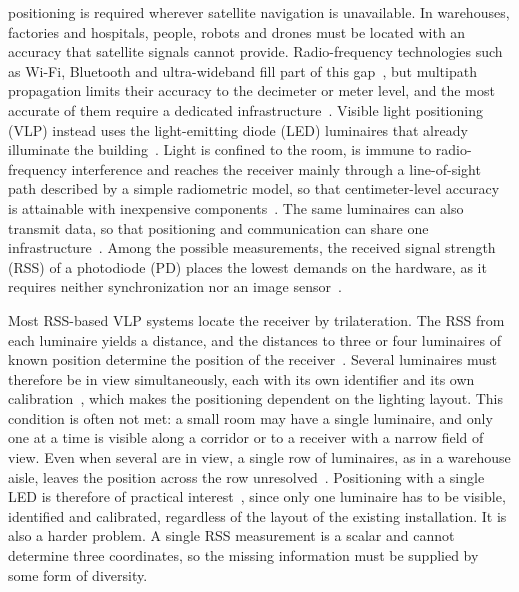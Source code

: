  positioning is required wherever satellite navigation is unavailable. In warehouses, factories and hospitals, people, robots and drones must be located with an accuracy that satellite signals cannot provide. Radio-frequency technologies such as Wi-Fi, Bluetooth and ultra-wideband fill part of this gap~\cite{Zafari2019}, but multipath propagation limits their accuracy to the decimeter or meter level, and the most accurate of them require a dedicated infrastructure~\cite{Lymberopoulos2015,Leitch2023}. Visible light positioning (VLP) instead uses the light-emitting diode (LED) luminaires that already illuminate the building~\cite{Zhuang2018,Bastiaens2024}. Light is confined to the room, is immune to radio-frequency interference and reaches the receiver mainly through a line-of-sight path described by a simple radiometric model, so that centimeter-level accuracy is attainable with inexpensive components~\cite{Zhu2025}. The same luminaires can also transmit data, so that positioning and communication can share one infrastructure~\cite{Haas:16,Ma2022}. Among the possible measurements, the received signal strength (RSS) of a photodiode (PD) places the lowest demands on the hardware, as it requires neither synchronization nor an image sensor~\cite{Bastiaens2026}.

Most RSS-based VLP systems locate the receiver by trilateration. The RSS from each luminaire yields a distance, and the distances to three or four luminaires of known position determine the position of the receiver~\cite{Zhuang2018,Plets2019}. Several luminaires must therefore be in view simultaneously, each with its own identifier and its own calibration~\cite{Bastiaens2020}, which makes the positioning dependent on the lighting layout. This condition is often not met: a small room may have a single luminaire, and only one at a time is visible along a corridor or to a receiver with a narrow field of view. Even when several are in view, a single row of luminaires, as in a warehouse aisle, leaves the position across the row unresolved~\cite{Bastiaens2026}. Positioning with a single LED is therefore of practical interest~\cite{Wang2024}, since only one luminaire has to be visible, identified and calibrated, regardless of the layout of the existing installation. It is also a harder problem. A single RSS measurement is a scalar and cannot determine three coordinates, so the missing information must be supplied by some form of diversity.

